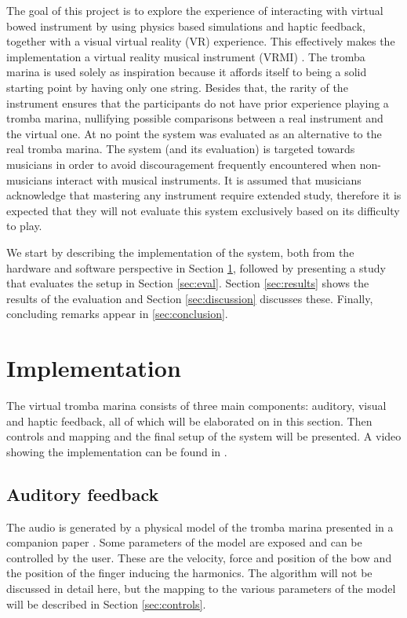 \documentclass[dvipsnames, pdftex]{article}
\begin{document}
The goal of this project is to explore the experience of interacting with virtual bowed instrument by using physics based simulations and haptic feedback, together with a visual virtual reality (VR) experience. This effectively makes the implementation a virtual reality musical instrument (VRMI) \cite{Serafin2016}. The tromba marina is used solely as inspiration because it affords itself to being a solid starting point by having only one string. Besides that, the rarity of the instrument ensures that the participants do not have prior experience playing a tromba marina, nullifying possible comparisons between a real instrument and the virtual one. At no point the system was evaluated as an alternative to the real tromba marina. The system (and its evaluation) is targeted towards musicians in order to avoid discouragement frequently encountered when non-musicians interact with musical instruments. It is assumed that musicians acknowledge that mastering any instrument require extended study, therefore it is expected that they will not evaluate this system exclusively based on its difficulty to play.

We start by describing the implementation of the system, both from the hardware and software perspective in Section \ref{sec:implementation}, followed by presenting a study that evaluates the setup in Section \ref{sec:eval}. Section \ref{sec:results} shows the results of the evaluation and Section \ref{sec:discussion} discusses these. Finally, concluding remarks appear in \ref{sec:conclusion}.

\section{Implementation}\label{sec:implementation}
The virtual tromba marina consists of three main components: auditory, visual and haptic feedback, all of which will be elaborated on in this section. Then controls and mapping and the final setup of the system will be presented. A video showing the implementation can be found in \cite{Trombavideo2020}.

\subsection{Auditory feedback}
The audio is generated by a physical model of the tromba marina presented in a companion paper \cite{Willemsen2020}. Some parameters of the model are exposed and can be controlled by the user. These are the velocity, force and position of the bow and the position of the finger inducing the harmonics. The algorithm will not be discussed in detail here, but the mapping to the various parameters of the model will be described in Section \ref{sec:controls}.
\end{document}
